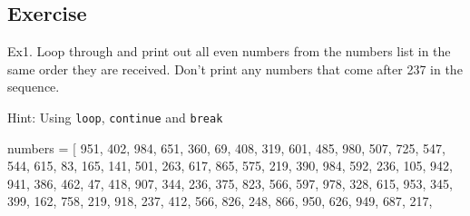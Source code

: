 \documentclass[11pt]{article}
\newenvironment{Shaded}{}{}
\newcommand{\DecValTok}[1]{\textcolor[rgb]{0.25,0.63,0.44}{{#1}}}
\newcommand{\NormalTok}[1]{{#1}}
\newcommand{\OperatorTok}[1]{\textcolor[rgb]{0.40,0.40,0.40}{{#1}}}
\begin{document}
    \subsection{Exercise}\label{exercise}

Ex1. Loop through and print out all even numbers from the numbers list
in the same order they are received. Don't print any numbers that come
after 237 in the sequence.

Hint: Using \texttt{loop}, \texttt{continue} and \texttt{break}

\begin{Shaded}
\begin{Highlighting}[]

\NormalTok{numbers }\OperatorTok{=}\NormalTok{ [}
    \DecValTok{951}\NormalTok{, }\DecValTok{402}\NormalTok{, }\DecValTok{984}\NormalTok{, }\DecValTok{651}\NormalTok{, }\DecValTok{360}\NormalTok{, }\DecValTok{69}\NormalTok{, }\DecValTok{408}\NormalTok{, }\DecValTok{319}\NormalTok{, }\DecValTok{601}\NormalTok{, }\DecValTok{485}\NormalTok{, }\DecValTok{980}\NormalTok{, }\DecValTok{507}\NormalTok{, }\DecValTok{725}\NormalTok{, }\DecValTok{547}\NormalTok{, }\DecValTok{544}\NormalTok{,}
    \DecValTok{615}\NormalTok{, }\DecValTok{83}\NormalTok{, }\DecValTok{165}\NormalTok{, }\DecValTok{141}\NormalTok{, }\DecValTok{501}\NormalTok{, }\DecValTok{263}\NormalTok{, }\DecValTok{617}\NormalTok{, }\DecValTok{865}\NormalTok{, }\DecValTok{575}\NormalTok{, }\DecValTok{219}\NormalTok{, }\DecValTok{390}\NormalTok{, }\DecValTok{984}\NormalTok{, }\DecValTok{592}\NormalTok{, }\DecValTok{236}\NormalTok{, }\DecValTok{105}\NormalTok{, }\DecValTok{942}\NormalTok{, }\DecValTok{941}\NormalTok{,}
    \DecValTok{386}\NormalTok{, }\DecValTok{462}\NormalTok{, }\DecValTok{47}\NormalTok{, }\DecValTok{418}\NormalTok{, }\DecValTok{907}\NormalTok{, }\DecValTok{344}\NormalTok{, }\DecValTok{236}\NormalTok{, }\DecValTok{375}\NormalTok{, }\DecValTok{823}\NormalTok{, }\DecValTok{566}\NormalTok{, }\DecValTok{597}\NormalTok{, }\DecValTok{978}\NormalTok{, }\DecValTok{328}\NormalTok{, }\DecValTok{615}\NormalTok{, }\DecValTok{953}\NormalTok{, }\DecValTok{345}\NormalTok{,}
    \DecValTok{399}\NormalTok{, }\DecValTok{162}\NormalTok{, }\DecValTok{758}\NormalTok{, }\DecValTok{219}\NormalTok{, }\DecValTok{918}\NormalTok{, }\DecValTok{237}\NormalTok{, }\DecValTok{412}\NormalTok{, }\DecValTok{566}\NormalTok{, }\DecValTok{826}\NormalTok{, }\DecValTok{248}\NormalTok{, }\DecValTok{866}\NormalTok{, }\DecValTok{950}\NormalTok{, }\DecValTok{626}\NormalTok{, }\DecValTok{949}\NormalTok{, }\DecValTok{687}\NormalTok{, }\DecValTok{217}\NormalTok{,}

\end{Highlighting}
\end{Shaded}
\end{document}
